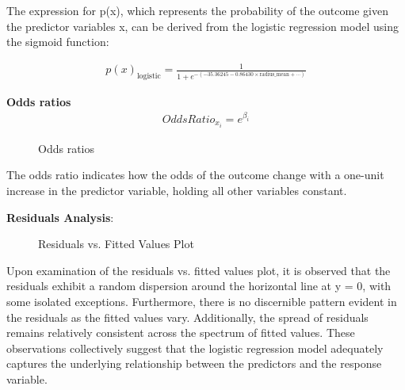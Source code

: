 \documentclass[conference]{IEEEtran}
\begin{document}
\vspace{0.5cm}

The expression for p(x), which represents the probability of the outcome given the predictor variables x, can be derived from the logistic regression model using the sigmoid function:

\begin{equation}
\begin{aligned}
p(x)_{\text{logistic}} = \frac{1}{1 + e^{-\left(-35.36245 - 0.86430 \times \text{radius\_mean} +  \dotsb \right)}}
\end{aligned}
\end{equation}

\vspace{0.5cm}

\textbf{Odds ratios}
\begin{equation}
\begin{aligned}
OddsRatio_{x_i} = e^{\beta_i}
\end{aligned}
\end{equation}

\vspace{0.5cm}

\begin{figure}[!h]
      \centering
       {}
      \caption{Odds ratios}
\end{figure}
\vspace{0.5cm}

The odds ratio indicates how the odds of the outcome change with a one-unit increase in the predictor variable, holding all other variables constant.
\vspace{0.5cm}

\textbf{Residuals Analysis}:

\begin{figure}[!h]
      \centering
       {}
      \caption{Residuals vs. Fitted Values Plot}
      \label{fig:log_resvsfit}
\end{figure}

\vspace{0.5cm}

Upon examination of the residuals vs. fitted values plot, it is observed that the residuals exhibit a random dispersion around the horizontal line at y = 0, with some isolated exceptions. Furthermore, there is no discernible pattern evident in the residuals as the fitted values vary. Additionally, the spread of residuals remains relatively consistent across the spectrum of fitted values. These observations collectively suggest that the logistic regression model adequately captures the underlying relationship between the predictors and the response variable.
\end{document}
